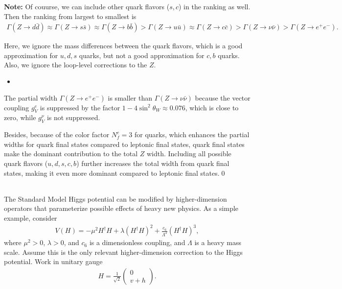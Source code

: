 \textbf{Note:} Of couurse, we can include other quark flavors ($s, c$) in the ranking as well. Then the ranking from largest to smallest is 
\begin{align}
    \Gamma(Z\to d \bar{d}) \approx \Gamma(Z\to s \bar{s}) \approx \Gamma(Z\to b \bar{b}) > \Gamma(Z\to u \bar{u}) \approx \Gamma(Z\to c \bar{c}) > \Gamma(Z\to \nu \bar{\nu}) > \Gamma(Z\to e^+ e^-).
\end{align}

Here, we ignore the mass differences between the quark flavors, which is a good approximation for $u, d, s$ quarks, but not a good approximation for $c, b$ quarks. Also, we ignore the loop-level corrections to the $Z$. 


\begin{itemize}
    \item [(c)]
\end{itemize}
The partial width $\Gamma(Z\to e^+ e^-)$ is smaller than $\Gamma(Z\to \nu \bar{\nu})$ because the vector coupling $g_V^e$ is suppressed by the factor $1-4\sin^2\theta_W \approx 0.076$, which is close to zero, while $g_V^\nu$ is not suppressed. 

Besides, because of the color factor $N_f^c=3$ for quarks, which enhances the partial widths for quark final states compared to leptonic final states, quark final states make the dominant contribution to the total $Z$ width. Including all possible quark flavors ($u, d, s, c, b$) further increases the total width from quark final states, making it even more dominant compared to leptonic final states.\qed







\clearpage
{}\\
The Standard Model Higgs potential can be modified by higher-dimension operators that parameterize possible effects of heavy new physics. As a simple example, consider 
\begin{align}
    V(H)= -\mu^2 H^\dagger H + \lambda (H^\dagger H)^2 + \frac{c_6}{\Lambda^2} (H^\dagger H)^3,
\end{align}
where $\mu^2>0$, $\lambda>0$, and $c_6$ is a dimensionless coupling, and $\Lambda$ is a heavy mass scale. Assume this is the only relevant higher-dimension correction to the Higgs potential. Work in unitary gauge 
\begin{align}
    H= \frac{1}{\sqrt{2}} \begin{pmatrix} 0 \\ v+h \end{pmatrix}.
\end{align}


